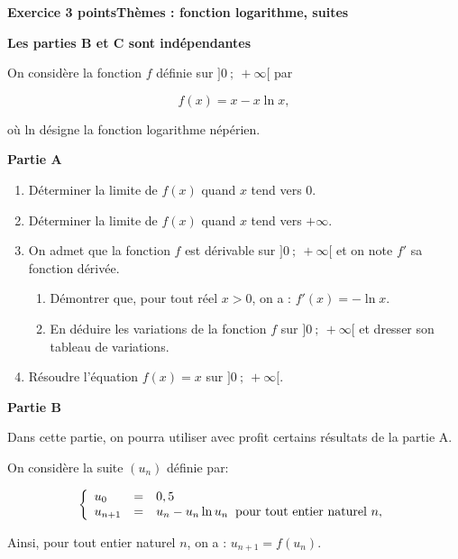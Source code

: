 \documentclass[11pt]{article}
\begin{document}
\bigskip

\textbf{Exercice 3  points\hfill Thèmes : fonction logarithme, suites}

\medskip

\textbf{Les parties B et C sont indépendantes}

\medskip

On considère la fonction $f$  définie sur $]0~;~+\infty[$ par 

\[f(x) = x - x \ln x,\]

où ln désigne la fonction logarithme népérien. 

\bigskip

\textbf{Partie A}

\medskip

\begin{enumerate}
\item Déterminer la limite de $f(x)$ quand $x$ tend vers $0$.
\item Déterminer la limite de $f(x)$ quand $x$ tend vers $+\infty$.
\item On admet que la fonction $f$ est dérivable sur $]0~;~+\infty[$ et on note $f'$ sa fonction dérivée.
	\begin{enumerate}
		\item Démontrer que, pour tout réel $x > 0$, on a : $f'(x) = - \ln x$.
		\item En déduire les variations de la fonction $f$ sur $]0~;~+\infty[$ et dresser son tableau de
variations.
	\end{enumerate}
\item Résoudre l'équation $f(x) = x$ sur $]0~;~+\infty[$.
\end{enumerate}

\bigskip

\textbf{Partie B}

\medskip

Dans cette partie, on pourra utiliser avec profit certains résultats de la partie A. 

On considère la suite $\left(u_n\right)$ définie par:

\[\left\{\begin{array}{l c l}
u_0 &=& 0,5\\
u_{n+1} &=& u_n - u_n \ln u_n \:\text{ pour tout entier naturel } n,
\end{array}\right.\]

Ainsi, pour tout entier naturel $n$, on a : $u_{n+1} = f\left(u_n\right)$.

\medskip
\end{document}
